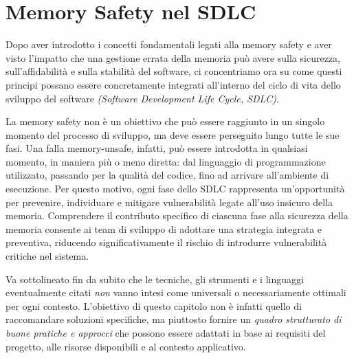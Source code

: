 \chapter{Memory Safety nel SDLC}
\label{cha:sdlc}

Dopo aver introdotto i concetti fondamentali legati alla memory safety e aver
visto l'impatto che una gestione errata della memoria può avere sulla sicurezza,
sull'affidabilità e sulla stabilità del software, ci concentriamo ora su come
questi principi possano essere concretamente integrati all'interno del ciclo di
vita dello sviluppo del software \textit{(Software Development Life Cycle, SDLC)}.

La memory safety non è un obiettivo che può essere raggiunto in un singolo
momento del processo di sviluppo, ma deve essere perseguito lungo tutte le sue fasi.
Una falla memory-unsafe, infatti, può essere introdotta in qualsiasi momento, in
maniera più o meno diretta: dal linguaggio di programmazione utilizzato, passando
per la qualità del codice, fino ad arrivare all'ambiente di esecuzione. Per questo
motivo, ogni fase dello SDLC rappresenta un'opportunità per prevenire, individuare
e mitigare vulnerabilità legate all'uso insicuro della memoria. Comprendere il
contributo specifico di ciascuna fase alla sicurezza della memoria consente ai
team di sviluppo di adottare una strategia integrata e preventiva, riducendo significativamente
il rischio di introdurre vulnerabilità critiche nel sistema.

Va sottolineato fin da subito che le tecniche, gli strumenti e i linguaggi eventualmente
citati \textit{non} vanno intesi come universali o necessariamente ottimali per
ogni contesto. L'obiettivo di questo capitolo non è infatti quello di raccomandare
soluzioni specifiche, ma piuttosto fornire un \textit{quadro strutturato di
buone pratiche e approcci} che possono essere adattati in base ai requisiti del progetto,
alle risorse disponibili e al contesto applicativo.






